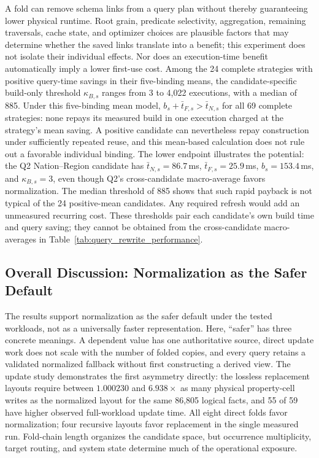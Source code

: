 \documentclass[sigconf]{acmart}
\begin{document}
A fold can remove schema links from a query plan without thereby guaranteeing
lower physical runtime. Root grain, predicate selectivity, aggregation,
remaining traversals, cache state, and optimizer choices are plausible factors
that may determine whether the saved links translate into a benefit; this
experiment does not isolate their individual effects. Nor does an
execution-time benefit automatically imply a lower first-use cost. Among the
24 complete strategies with positive query-time savings in their five-binding
means, the candidate-specific build-only threshold $\kappa_{B,s}$ ranges from
3 to 4,022 executions, with a median of 885. Under this five-binding mean model,
$b_s+\bar t_{F,s}>\bar t_{N,s}$ for all 69 complete strategies: none repays its
measured build in one execution charged at the strategy's mean saving. A
positive candidate can nevertheless repay construction under sufficiently
repeated reuse, and this mean-based calculation does not rule out a favorable
individual binding. The lower endpoint illustrates the potential: the Q2
Nation--Region candidate has $\bar t_{N,s}=86.7$\,ms,
$\bar t_{F,s}=25.9$\,ms, $b_s=153.4$\,ms, and $\kappa_{B,s}=3$, even though
Q2's cross-candidate macro-average favors normalization. The median threshold
of 885 shows that such rapid payback is not typical of the 24 positive-mean
candidates. Any required refresh would add an unmeasured recurring cost.
These thresholds pair each candidate's own build time and query saving; they
cannot be obtained from the cross-candidate macro-averages in
Table~\ref{tab:query_rewrite_performance}.

\subsection{Overall Discussion: Normalization as the Safer Default}

The results support normalization as the safer default under the tested
workloads, not as a universally faster representation. Here, ``safer'' has
three concrete meanings. A dependent value has one authoritative source,
direct update work does not scale with the number of folded copies, and every
query retains a validated normalized fallback without first constructing a
derived view. The update study demonstrates the first asymmetry directly:
the lossless replacement layouts require between $1.000230$ and $6.938\times$ as
many physical property-cell writes as the normalized layout for the same
86,805 logical facts, and 55 of 59 have higher observed full-workload update
time. All eight direct folds favor normalization; four recursive layouts favor
replacement in the single measured run. Fold-chain length organizes the
candidate space, but occurrence multiplicity, target routing, and system state
determine much of the operational exposure.
\end{document}
